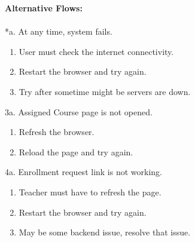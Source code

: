 \textbf{Alternative Flows:}\\
\\
*a. At any time, system fails.
\begin{enumerate}
\item User must check the internet connectivity.
\item Restart the browser and try again.
\item Try after sometime might be servers are down.
\end{enumerate}
3a. Assigned Course page is not opened.
\begin{enumerate}
\item Refresh the browser.
\item Reload the page and try again.
\end{enumerate}
4a. Enrollment request link is not working.
\begin{enumerate}
\item Teacher must have to refresh the page.
\item Restart the browser and try again.
\item May be some backend issue, resolve that issue.
\end{enumerate}

